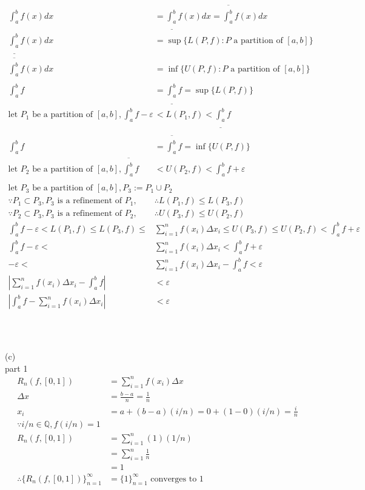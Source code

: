 \documentclass[12pt, border = 4pt, multi]{article} %
\begin{document}
\begin{align*}
\int_a ^ b f(x) dx &=  \underline{\int_a ^ b}f(x)dx = \overline{\int_a ^ b}f(x)dx\\
\underline{\int_a ^ b}f(x)dx &= \sup\{L(P, f): P \text{ a partition of }[a, b]\}\\
\overline{\int_a ^ b}f(x)dx &= \inf\{U(P, f): P \text{ a partition of }[a, b]\}\\
\\
\int_a ^ b f &= \underline{\int_a ^ b} f = \sup\{L(P, f)\}\\
\text{let } P_1 \text{ be a partition of }[a, b], \int_a ^ b f - \varepsilon &< L(P_1, f) < \underline{\int_a ^ b} f\\
\\
\int_a ^ b f &= \overline{\int_a ^ b} f = \inf\{U(P, f)\}\\
\text{let } P_2 \text{ be a partition of }[a, b], \overline{\int_a ^ b} f &< U(P_2, f) < \int_a ^ b f + \varepsilon\\
\\
\text{let } P_3 \text{ be a partition of }[a, b], P_3 := P_1 \cup P_2\\
\because P_1 \subset P_3, P_3 \text{ is a refinement of } P_1, &\therefore L(P_1, f) \leq L(P_3, f)\\
\because P_2 \subset P_3, P_3 \text{ is a refinement of } P_2, &\therefore U(P_3, f) \leq U(P_2, f)\\
\int_a ^ b f - \varepsilon < L(P_1, f) \leq L(P_3, f) \leq &\sum_{i = 1} ^ n f(x_i)\Delta x_i \leq U(P_3, f) \leq U(P_2, f) < \int_a ^ b f + \varepsilon\\
\int_a ^ b f - \varepsilon < &\sum_{i = 1} ^ n f(x_i)\Delta x_i < \int_a ^ b f + \varepsilon\\
- \varepsilon < &\sum_{i = 1} ^ n f(x_i)\Delta x_i - \int_a ^ b f < \varepsilon\\
\left|\sum_{i = 1} ^ n f(x_i)\Delta x_i - \int_a ^ b f\right| &< \varepsilon\\
\left|\int_a ^ b f - \sum_{i = 1} ^ n f(x_i)\Delta x_i\right| &< \varepsilon\\
\end{align*}
\\
\\
\\
(c)\\
part 1
\begin{align*}
R_n(f, [0, 1]) &= \sum_{i = 1} ^ n f(x_i) \Delta x\\
\Delta x &= \frac{b - a}{n} = \frac{1}{n}\\
x_i &= a + (b - a)(i / n) = 0 + (1 - 0)(i / n) = \frac{i}{n}\\
\because i / n \in \mathbb{Q}, f(i / n) = 1\\
R_n(f, [0, 1]) &= \sum_{i = 1} ^ n (1)(1 / n)\\
&= \sum_{i = 1} ^ n \frac{1}{n}\\
&= 1\\
\therefore \{R_n(f, [0, 1])\}_{n = 1} ^ {\infty} &= \{1\}_{n = 1} ^ {\infty} \text{ converges to 1}\\
\end{align*}
\end{document}
